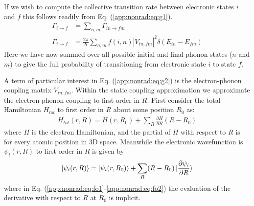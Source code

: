 If we wish to compute the collective transition rate between electronic states $i$ and $f$ this follows readily from Eq. (\ref{app:nonrad:eq:g1}).
\begin{align}
    \Gamma_{i \rightarrow f} &=\sum_{n,m} \Gamma_{in\rightarrow fm} \nonumber \\
    \Gamma_{i \rightarrow f}
    &=\frac{2\pi}{\hbar}\sum_{n,m}f(i,n)|V_{in,fm}|^2\delta(E_{in}-E_{fm})  \label{app:nonrad:eq:g2}
\end{align}
Here we have now summed over all possible initial and final phonon states ($n$ and $m$) to give the full probability of transitioning from electronic state $i$ to state $f$.

A term of particular interest in Eq. (\ref{app:nonrad:eq:g2}) is the electron-phonon coupling matrix $V_{in,fm}$. Within the static coupling approximation we approximate the electron-phonon coupling to first order in $R$. First consider the total Hamiltonian $H_{tot}$ to first order in $R$ about some position $R_{0}$ as:
\begin{align}
    H_{tot}(r,R) = H(r,R_0) + \sum_R \frac{\partial H}{\partial R} (R-R_0) \label{app:nonrad:eq:fo1}
\end{align}
where $H$ is the electron Hamiltonian, and the partial of $H$ with respect to $R$ is for every atomic position in 3D space. Meanwhile the electronic wavefunction is $\psi_{i}(r,R)$ to first order in $R$ is given by
\begin{align}
    \ket{\psi_i(r,R)} = \ket{\psi_i(r,R_0)} + \sum_R (R-R_0) \ket{\frac{\partial \psi_{i}}{\partial R}}\label{app:nonrad:eq:fo2}
\end{align}
where in Eq. (\ref{app:nonrad:eq:fo1}-\ref{app:nonrad:eq:fo2}) the evaluation of the derivative with respect to $R$ at $R_{0}$ is implicit.



